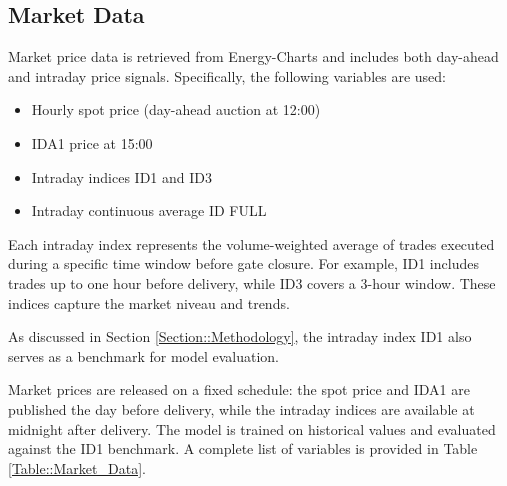 \documentclass[class=scrbook, crop=false]{standalone}
\begin{document}
\subsection{Market Data}
\label{Section::Market_Data}

Market price data is retrieved from Energy-Charts and includes both day-ahead and intraday price signals. Specifically, the following variables are used:
\begin{itemize}
\item Hourly spot price (day-ahead auction at 12:00)
\item \gls{IDA1} price at 15:00
\item Intraday indices ID1 and ID3
\item Intraday continuous average ID FULL
\end{itemize}

Each intraday index represents the volume-weighted average of trades executed during a specific time window before gate closure. For example, ID1 includes trades up to one hour before delivery, while ID3 covers a 3-hour window. These indices capture the market niveau and trends. 

As discussed in Section \ref{Section::Methodology}, the intraday index ID1 also serves as a benchmark for model evaluation.

Market prices are released on a fixed schedule: the spot price and \gls{IDA1} are published the day before delivery, while the intraday indices are available at midnight after delivery. The model is trained on historical values and evaluated against the ID1 benchmark. A complete list of variables is provided in Table \ref{Table::Market_Data}.



\end{document}
